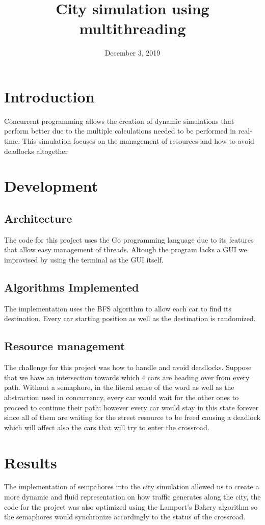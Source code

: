 \documentclass[a4paper]{article}
\title{City simulation using multithreading}
\date{\color{black}December 3, 2019}
\begin{document}
 \maketitle

\section{Introduction}
Concurrent programming allows the creation of dynamic simulations that perform better due to the multiple calculations needed to be performed in real-time. This simulation focuses on the management of resources and how to avoid deadlocks altogether

\section{Development}
    \subsection{Architecture}
        The code for this project uses the Go programming language due to its features that allow easy management of threads. Altough the program lacks a GUI we improvised by using the terminal as the GUI itself.
    \subsection{Algorithms Implemented}
        The implementation uses the BFS algorithm to allow each car to find its destination. Every car starting position as well as the destination is randomized.
    \subsection{Resource management}
    The challenge for this project was how to handle and avoid deadlocks. Suppose that we have an intersection towards which 4 cars are heading over from every path. Without a semaphore, in the literal sense of the word as well as the abstraction used in concurrency, every car would wait for the other ones to proceed to continue their path; however every car would stay in this state forever since all of them are waiting for the street resource to be freed causing a deadlock which will affect also the cars that will try to enter the crossroad.
\section{Results}

The implementation of sempahores into the city simulation allowed us to create a more dynamic and fluid representation on how traffic generates along the city, the code for the project was also optimized using the Lamport's Bakery algorithm so the semaphores would synchronize accordingly to the status of the crossroad.
\end{document}
